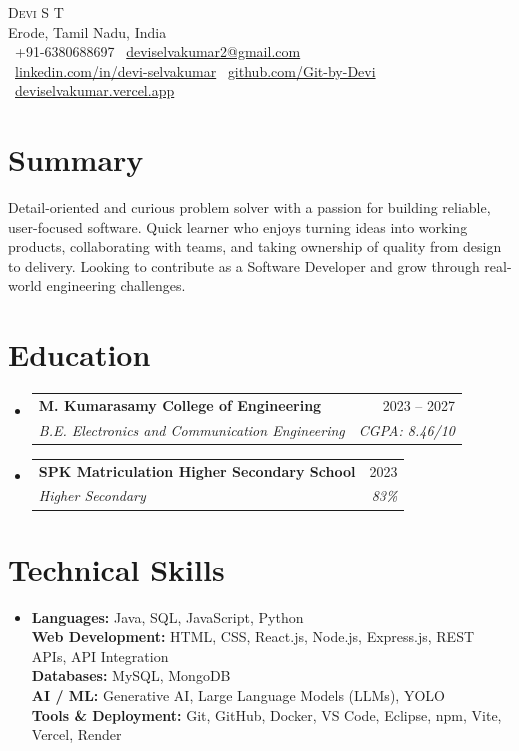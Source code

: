 \documentclass[letterpaper,10.5pt]{article}
\makeatletter
\newcommand{\resumeSubheading}[4]{
  \vspace{1pt}\item
  \begin{tabular*}{1.0\textwidth}[t]{l@{\extracolsep{\fill}}r}
    \textbf{#1} & \small #2 \\
    \textit{\small#3} & \textit{\small #4} \\
  \end{tabular*}\vspace{-4pt}
}
\newcommand{\resumeSubHeadingListStart}{\begin{itemize}[leftmargin=0in,label={},itemsep=4pt]}
\newcommand{\resumeSubHeadingListEnd}{\end{itemize}}
\makeatother
\begin{document}
\begin{center}
    {\Huge \scshape Devi S T}\\
    Erode, Tamil Nadu, India\\
    \small
    \faPhone\ +91-6380688697 \quad
    \faEnvelope\ \href{mailto:deviselvakumar2@gmail.com}{deviselvakumar2@gmail.com}\\
    \faLinkedin\ \href{https://www.linkedin.com/in/devi-selvakumar}{linkedin.com/in/devi-selvakumar}
    \quad
    \faGithub\ \href{https://github.com/Git-by-Devi}{github.com/Git-by-Devi}
    \quad
    \faGlobe\ \href{https://deviselvakumar.vercel.app/}{deviselvakumar.vercel.app}
\end{center}


\section{Summary}
\small
Detail-oriented and curious problem solver with a passion for building reliable, user-focused software. Quick learner who enjoys turning ideas into working products, collaborating with teams, and taking ownership of quality from design to delivery. Looking to contribute as a Software Developer and grow through real-world engineering challenges.


\section{Education}
\resumeSubHeadingListStart

\resumeSubheading
{M. Kumarasamy College of Engineering}{2023 -- 2027}
{B.E. Electronics and Communication Engineering}{CGPA: 8.46/10}

\resumeSubheading
{SPK Matriculation Higher Secondary School}{2023}
{Higher Secondary}{83\%}

\resumeSubHeadingListEnd


\section{Technical Skills}
\small
\begin{itemize}[leftmargin=0in,label={}]
\item
\textbf{Languages:} Java, SQL, JavaScript, Python \\
\textbf{Web Development:} HTML, CSS, React.js, Node.js, Express.js, REST APIs, API Integration \\
\textbf{Databases:} MySQL, MongoDB \\
\textbf{AI / ML:} Generative AI, Large Language Models (LLMs), YOLO \\
\textbf{Tools \& Deployment:} Git, GitHub, Docker, VS Code, Eclipse, npm, Vite, Vercel, Render \\
\end{itemize}
\end{document}
